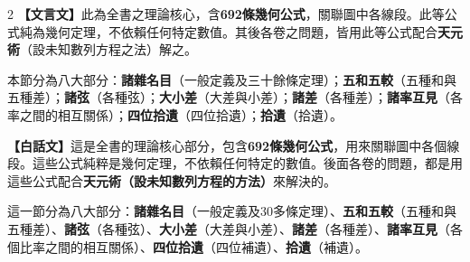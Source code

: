 \documentclass[11pt,a4paper]{article}
\begin{document}
\begin{paracol}{2}
\textbf{【文言文】}此為全書之理論核心，含\textbf{692條幾何公式}，關聯圖中各線段。此等公式純為幾何定理，不依賴任何特定數值。其後各卷之問題，皆用此等公式配合\textbf{天元術}（設未知數列方程之法）解之。

本節分為八大部分：\textbf{諸雜名目}（一般定義及三十餘條定理）；\textbf{五和五較}（五種和與五種差）；\textbf{諸弦}（各種弦）；\textbf{大小差}（大差與小差）；\textbf{諸差}（各種差）；\textbf{諸率互見}（各率之間的相互關係）；\textbf{四位拾遺}（四位拾遺）；\textbf{拾遺}（拾遺）。

\switchcolumn
\textbf{【白話文】}這是全書的理論核心部分，包含\textbf{692條幾何公式}，用來關聯圖中各個線段。這些公式純粹是幾何定理，不依賴任何特定的數值。後面各卷的問題，都是用這些公式配合\textbf{天元術（設未知數列方程的方法）}來解決的。

這一節分為八大部分：\textbf{諸雜名目}（一般定義及30多條定理）、\textbf{五和五較}（五種和與五種差）、\textbf{諸弦}（各種弦）、\textbf{大小差}（大差與小差）、\textbf{諸差}（各種差）、\textbf{諸率互見}（各個比率之間的相互關係）、\textbf{四位拾遺}（四位補遺）、\textbf{拾遺}（補遺）。
\end{paracol}

\vspace{0.3cm}
\end{document}
